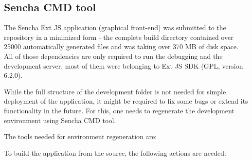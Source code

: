 



\subsection{Sencha CMD tool}
\hspace{0.6cm}

The Sencha Ext JS application (graphical front-end) was submitted to the repository in a minimized form - the complete build directory contained over 25000 automatically generated files and was taking over 370 MB of disk space. All of those dependencies are only required to run the debugging and the development server, most of them were belonging to Ext JS SDK (GPL, version 6.2.0).
\newline

\noindent
While the full structure of the development folder is not needed for simple deployment of the application, it might be required to fix some bugs or extend its functionality in the future. For this, one needs to regenerate the development environment using Sencha CMD tool.

\newpage
\noindent
The tools needed for environment regeneration are:
\newline

\noindent{}
\vspace{0.3cm}

\noindent{}
\newline

\noindent
To build the application from the source, the following actions are needed:

